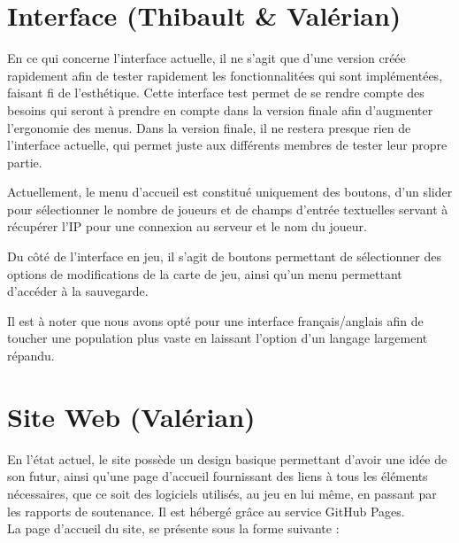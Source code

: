 \documentclass[12pt]{report}
\begin{document}
\section{Interface (Thibault \& Valérian)}

En ce qui concerne l’interface actuelle, il ne s’agit que d’une version créée rapidement afin de tester rapidement les fonctionnalitées qui sont implémentées, faisant fi de l’esthétique. Cette interface test permet de se rendre compte des besoins qui seront à prendre en compte dans la version finale afin d’augmenter l'ergonomie des menus. Dans la version finale, il ne restera presque rien de l'interface actuelle, qui permet juste aux différents membres de tester leur propre partie.

Actuellement, le menu d’accueil est constitué uniquement des boutons, d’un slider pour sélectionner le nombre de joueurs et de champs d’entrée textuelles servant à récupérer l’IP pour une connexion au serveur et le nom du joueur.

Du côté de l’interface en jeu, il s’agit de boutons permettant de sélectionner des options de modifications de la carte de jeu, ainsi qu’un menu permettant d'accéder à la sauvegarde.

Il est à noter que nous avons opté pour une interface français/anglais afin de toucher une population plus vaste en laissant l'option d'un langage largement répandu.

\section{Site Web (Valérian)}

En l’état actuel, le site possède un design basique permettant d’avoir une idée de son futur, ainsi qu’une page d’accueil fournissant des liens à tous les éléments nécessaires, que ce soit des logiciels utilisés, au jeu en lui même, en passant par les rapports de soutenance. Il est hébergé grâce au service GitHub Pages.\\
La page d’accueil du site, se présente sous la forme suivante :
\end{document}

